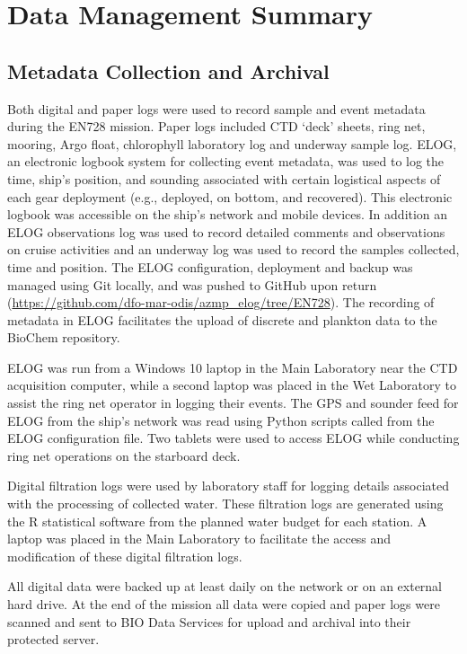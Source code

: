\documentclass[12pt]{article}\usepackage[]{graphicx}\usepackage[]{color}
\begin{document}
\section{Data Management Summary}\label{DM}

\subsection{Metadata Collection and Archival}\label{metadata-collection-and-archival}

Both digital and paper logs were used to record sample and event metadata during the EN728 mission. Paper logs included CTD `deck' sheets, ring net, mooring, Argo float, chlorophyll laboratory log and underway sample log. ELOG, an electronic logbook system for collecting event metadata, was used to log the time, ship's position, and sounding associated with certain logistical aspects of each gear deployment (e.g., deployed, on bottom, and recovered). This electronic logbook was accessible on the ship's network and mobile devices. In addition an ELOG observations log was used to record detailed comments and observations on cruise activities and an underway log was used to record the samples collected, time and position. The ELOG configuration, deployment and backup was managed using Git locally, and was pushed to GitHub upon return (\url{https://github.com/dfo-mar-odis/azmp_elog/tree/EN728}). The recording of metadata in ELOG facilitates the upload of discrete and plankton data to the BioChem repository.

ELOG was run from a Windows 10 laptop in the Main Laboratory near the CTD acquisition computer, while a second laptop was placed in the Wet Laboratory to assist the ring net operator in logging their events. The GPS and sounder feed for ELOG from the ship's network was read using Python scripts called from the ELOG configuration file. Two tablets were used to access ELOG while conducting ring net operations on the starboard deck.

Digital filtration logs were used by laboratory staff for logging details associated with the processing of collected water. These filtration logs are generated using the R statistical software from the planned water budget for each station. A laptop was placed in the Main Laboratory to facilitate the access and modification of these digital filtration logs.

All digital data were backed up at least daily on the network or on an external hard drive. At the end of the mission all data were copied and paper logs were scanned and sent to BIO Data Services for upload and archival into their protected server.
\end{document}

